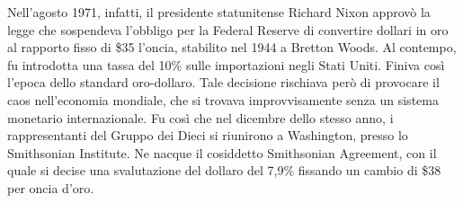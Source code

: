 \documentclass{article}
\begin{document}

Nell'agosto 1971, infatti, il presidente statunitense Richard Nixon approv\`{o} la legge che sospendeva l'obbligo per la Federal Reserve di convertire dollari in oro al rapporto fisso di \$35 l'oncia, stabilito nel 1944 a Bretton Woods. Al contempo, fu introdotta una tassa del 10\% sulle importazioni negli Stati Uniti. Finiva così l'epoca dello standard oro-dollaro.
Tale decisione rischiava per\`{o} di provocare il caos nell'economia mondiale, che si trovava improvvisamente senza un sistema monetario internazionale. Fu cos\`{i} che nel dicembre dello stesso anno, i rappresentanti del Gruppo dei Dieci si riunirono a Washington, presso lo Smithsonian Institute. Ne nacque il cosiddetto Smithsonian Agreement, con il quale si decise una svalutazione del dollaro del 7,9\%
fissando un cambio di \$38 per oncia d'oro.
\end{document}
